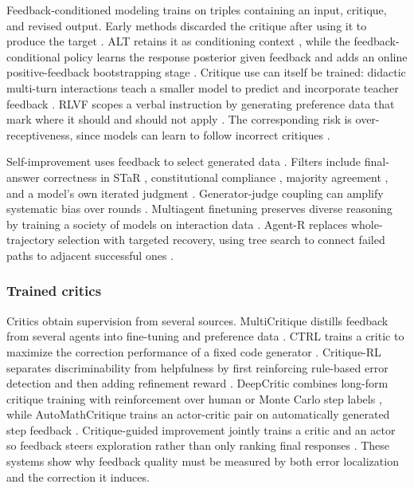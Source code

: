 Feedback-conditioned modeling trains on triples containing an input, critique, and revised output. Early methods discarded the critique after using it to produce the target \citep{scheurer2023training,chen2024ilf}. ALT retains it as conditioning context \citep{lloret2024towards}, while the feedback-conditional policy learns the response posterior given feedback and adds an online positive-feedback bootstrapping stage \citep{luo2025fcp}. Critique use can itself be trained: didactic multi-turn interactions teach a smaller model to predict and incorporate teacher feedback \citep{klissarov2026improving}. RLVF scopes a verbal instruction by generating preference data that mark where it should and should not apply \citep{stephan2024rlvf}. The corresponding risk is over-receptiveness, since models can learn to follow incorrect critiques \citep{sharma2024towards}.

Self-improvement uses feedback to select generated data \citep{singh2023beyond}. Filters include final-answer correctness in STaR \citep{zelikman2022star}, constitutional compliance \citep{bai2022constitutional}, majority agreement \citep{huang2022selfimprove}, and a model's own iterated judgment \citep{yuan2024self}. Generator-judge coupling can amplify systematic bias over rounds \citep{shumailov2023curse}. Multiagent finetuning preserves diverse reasoning by training a society of models on interaction data \citep{subramaniam2025multiagent}. Agent-R replaces whole-trajectory selection with targeted recovery, using tree search to connect failed paths to adjacent successful ones \citep{yuan2025agentr}.

\subsubsection{Trained critics}
\label{supp:subsec:learning-critics}

Critics obtain supervision from several sources. MultiCritique distills feedback from several agents into fine-tuning and preference data \citep{lan2024training}. CTRL trains a critic to maximize the correction performance of a fixed code generator \citep{xie2025teaching}. Critique-RL separates discriminability from helpfulness by first reinforcing rule-based error detection and then adding refinement reward \citep{xi2025critiquerl}. DeepCritic combines long-form critique training with reinforcement over human or Monte Carlo step labels \citep{yang2025deepcritic}, while AutoMathCritique trains an actor-critic pair on automatically generated step feedback \citep{xi2024enhancing}. Critique-guided improvement jointly trains a critic and an actor so feedback steers exploration rather than only ranking final responses \citep{yang2025lighthouse}. These systems show why feedback quality must be measured by both error localization and the correction it induces.


